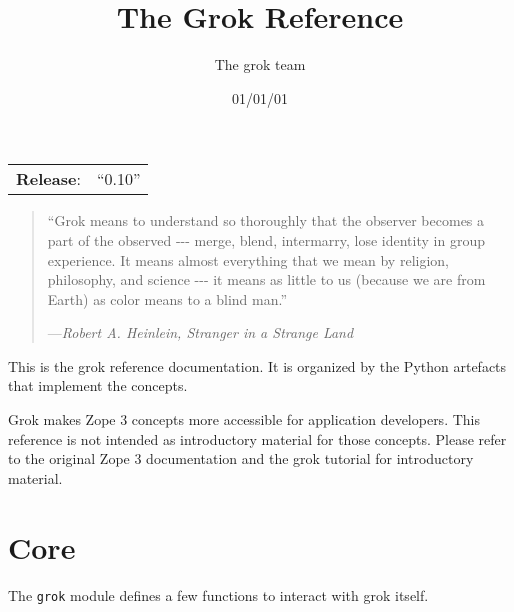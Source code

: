 \documentclass[10pt,a4paper,english]{manual}
\title{The Grok Reference}
\author{The grok team}
\date{01/01/01}
\newlength{\docinfowidth}
\newlength{\locallinewidth}
\newcommand{\titlereference}[1]{\textsl{#1}}
\begin{document}
\maketitle

\begin{center}
\begin{tabularx}{\docinfowidth}{lX}
\textbf{Release}: &
	``0.10'' \\
\end{tabularx}
\end{center}

\setlength{\locallinewidth}{\linewidth}

%  
\begin{quote}

``Grok means to understand so thoroughly that the observer becomes a
part of the observed -{}-{}- merge, blend, intermarry, lose identity in
group experience. It means almost everything that we mean by religion,
philosophy, and science -{}-{}- it means as little to us (because we are from
Earth) as color means to a blind man.''

\begin{flushright}
---\titlereference{Robert A. Heinlein, Stranger in a Strange Land}
\end{flushright}
\end{quote}

This is the grok reference documentation. It is organized by the Python
artefacts that implement the concepts.

Grok makes Zope 3 concepts more accessible for application
developers. This reference is not intended as introductory material
for those concepts. Please refer to the original Zope 3
documentation and the grok tutorial for introductory material.
\tableofcontents

\bigskip



\chapter{Core}

The \texttt{grok} module defines a few functions to interact with grok itself.


\end{document}
